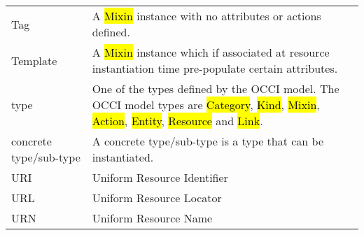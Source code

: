 \begin{tabular}{l|p{12cm}}
Tag & A \hl{Mixin} instance with no attributes or actions defined. \\

Template & A \hl{Mixin} instance which if associated at resource instantiation
time pre-populate certain attributes. \\

type & One of the types defined by the OCCI model.  The OCCI model types are
 \hl{Category}, \hl{Kind}, \hl{Mixin}, \hl{Action}, \hl{Entity}, \hl{Resource}
 and \hl{Link}. \\
 
concrete type/sub-type & A concrete type/sub-type is a type that can be instantiated.\\

URI & Uniform Resource Identifier \\
URL & Uniform Resource Locator \\
URN & Uniform Resource Name \\
\end{tabular}
